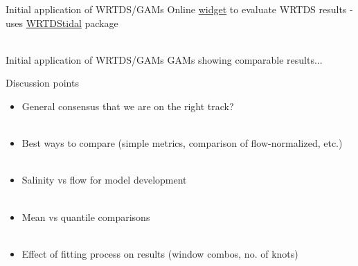 \documentclass[serif]{beamer}\usepackage[]{graphicx}\usepackage[]{color}
\begin{document}
\begin{frame}{Initial application of WRTDS/GAMs}
Online \href{https://beckmw.shinyapps.io/patux_mods/}{widget} to evaluate WRTDS results - uses \href{https://github.com/fawda123/wtreg_for_estuaries}{WRTDStidal} package \\~\\
\centerline{}
\end{frame}

\begin{frame}{Initial application of WRTDS/GAMs}
GAMs showing comparable results...
\end{frame}

\begin{frame}{Discussion points}
\begin{itemize}
\item General consensus that we are on the right track?\\~\\
\item Best ways to compare (simple metrics, comparison of flow-normalized, etc.) \\~\\
\item Salinity vs flow for model development \\~\\
\item Mean vs quantile comparisons \\~\\
\item Effect of fitting process on results (window combos, no. of knots)
\end{itemize}
\end{frame}
\end{document}
